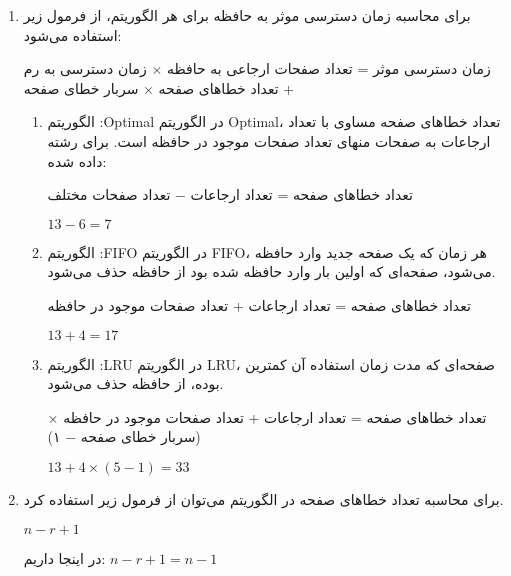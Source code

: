 \begin{qsolve}
	\begin{enumerate}
		\item  برای محاسبه زمان دسترسی موثر به حافظه برای هر الگوریتم، از فرمول زیر استفاده می‌شود:
		
		زمان دسترسی موثر = تعداد صفحات ارجاعی به حافظه × زمان دسترسی به رم + تعداد خطاهای صفحه × سربار خطای صفحه
		
		\begin{enumerate}
			\item الگوریتم :Optimal
			در الگوریتم Optimal، تعداد خطاهای صفحه مساوی با تعداد ارجاعات به صفحات منهای تعداد صفحات موجود در حافظه است. برای رشته داده شده:
			
			تعداد خطاهای صفحه = تعداد ارجاعات − تعداد صفحات مختلف
			
			$13 - 6 = 7$
			
			
			\item الگوریتم :FIFO
			در الگوریتم FIFO، هر زمان که یک صفحه جدید وارد حافظه می‌شود، صفحه‌ای که اولین بار وارد حافظه شده بود از حافظه حذف می‌شود.
			
			تعداد خطاهای صفحه = تعداد ارجاعات + تعداد صفحات موجود در حافظه
			
			$13 + 4 = 17$
			
			\item الگوریتم :LRU
			در الگوریتم LRU، صفحه‌ای که مدت زمان استفاده آن کمترین بوده، از حافظه حذف می‌شود.
			
			تعداد خطاهای صفحه = تعداد ارجاعات + تعداد صفحات موجود در حافظه × (سربار خطای صفحه − ۱)
			
			$13 + 4 \times (5 - 1) = 33$
		\end{enumerate}
		
		\item برای محاسبه تعداد خطا‌های صفحه در الگوریتم می‌توان از فرمول زیر استفاده کرد.
		
		$ n - r + 1 $
		
		در اینجا داریم: 
		$n - r + 1 = n - 1$
	\end{enumerate}

\end{qsolve}







